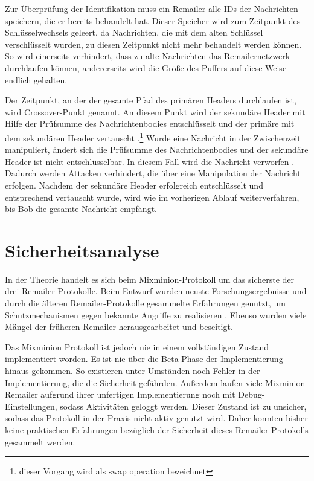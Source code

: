 Zur Überprüfung der Identifikation muss ein Remailer alle IDs der Nachrichten speichern, die er bereits behandelt hat. Dieser Speicher wird zum Zeitpunkt des Schlüsselwechsels geleert, da Nachrichten, die mit dem alten Schlüssel verschlüsselt wurden, zu diesen Zeitpunkt nicht mehr behandelt werden können. So wird einerseits verhindert, dass zu alte Nachrichten das Remailernetzwerk durchlaufen können, andererseits wird die Größe des Puffers auf diese Weise endlich gehalten.

Der Zeitpunkt, an der der gesamte Pfad des primären Headers durchlaufen ist, wird \glqq Crossover\grqq -Punkt genannt. An diesem Punkt wird der sekundäre Header mit Hilfe der Prüfsumme des Nachrichtenbodies entschlüsselt und der primäre mit dem sekundären Header vertauscht \cite[S. 4f.]{mixminion}.\footnote{dieser Vorgang wird als swap operation bezeichnet}  Wurde eine Nachricht in der Zwischenzeit manipuliert, ändert sich die Prüfsumme des Nachrichtenbodies und der sekundäre Header ist nicht entschlüsselbar. In diesem Fall wird die Nachricht verworfen \cite[S. 5]{mixminion}. Dadurch werden Attacken verhindert, die über eine Manipulation der Nachricht erfolgen. Nachdem der sekundäre Header erfolgreich entschlüsselt und entsprechend vertauscht wurde, wird wie im vorherigen Ablauf weiterverfahren, bis Bob die gesamte Nachricht empfängt. 

\section{Sicherheitsanalyse}
In der Theorie handelt es sich beim Mixminion-Protokoll um das sicherste der drei Remailer-Protokolle. Beim Entwurf wurden neuste Forschungsergebnisse und durch die älteren Remailer-Protokolle gesammelte Erfahrungen genutzt, um Schutzmechanismen gegen bekannte Angriffe zu realisieren \cite[S. 5ff.]{mixminion}. Ebenso wurden viele Mängel der früheren Remailer herausgearbeitet und beseitigt. 

Das Mixminion Protokoll ist jedoch nie in einem vollständigen Zustand implementiert worden. Es ist nie über die Beta-Phase der Implementierung hinaus gekommen. So existieren unter Umständen noch Fehler in der Implementierung, die die Sicherheit gefährden. Außerdem laufen viele Mixminion-Remailer aufgrund ihrer unfertigen Implementierung noch mit Debug-Einstellungen, sodass Aktivitäten geloggt werden. Dieser Zustand ist zu unsicher, sodass das Protokoll in der Praxis nicht aktiv genutzt wird. Daher konnten bisher keine praktischen Erfahrungen bezüglich der Sicherheit dieses Remailer-Protokolls gesammelt werden.


